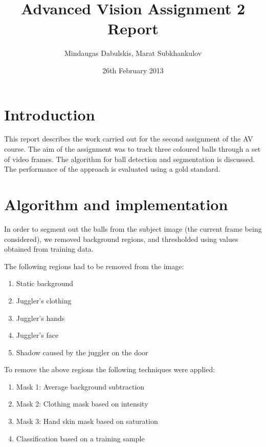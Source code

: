 \documentclass[10pt,a4paper,oneclumn]{article}
\title{Advanced Vision Assignment 2 Report}  %
\author{Mindaugas Dabulskis, Marat Subkhankulov}                      %
\date{26th February 2013}                 %
\begin{document}
\maketitle  %
%
\section{Introduction}

This report describes the work carried out for the second assignment of the AV course.
The aim of the assignment was to track three coloured balls through a set of video frames.
The algorithm for ball detection and segmentation is discussed. 
The performance of the approach is evaluated using a gold standard.

\section{Algorithm and implementation}

In order to segment out the balls from the subject image (the current frame being considered), we removed background regions, and thresholded using values obtained from training data.

The following regions had to be removed from the image: 
\begin{enumerate}
\item Static background
\item Juggler's clothing
\item Juggler's hands
\item Juggler's face
\item Shadow caused by the juggler on the door
\end{enumerate}

To remove the above regions the following techniques were applied:

\begin{enumerate}
\item Mask 1: Average background subtraction
\item Mask 2: Clothing mask based on intensity
\item Mask 3: Hand skin mask based on saturation
\item Classification based on a training sample
\end{enumerate}
\end{document}
